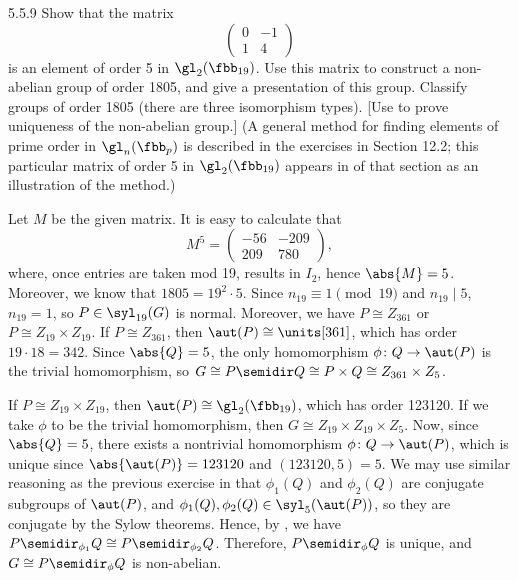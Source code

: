 \begin{exercise}{5.5.9}
    Show that the matrix
    \[
        \begin{pmatrix}
            0 & -1 \\
            1 & 4
        \end{pmatrix}
    \]
    is an element of order 5 in $\gl_2(\fbb_{19})$.
	Use this matrix to construct a non-abelian group of order 1805, and give a presentation of this group.
	Classify groups of order 1805 (there are three isomorphism types). [Use  to prove uniqueness of the non-abelian group.] (A general method for finding elements of prime order in $\gl_n(\fbb_p)$ is described in the exercises in Section 12.2; this particular matrix of order 5 in $\gl_2(\fbb_{19})$ appears in  of that section as an illustration of the method.)
\end{exercise}

\begin{sol}
    Let $M$ be the given matrix.
	It is easy to calculate that
    \[
    	M^5 = 
        \begin{pmatrix}
        -56 & -209 \\
        209 & 780
        \end{pmatrix},
	\]
    where, once entries are taken mod 19, results in $I_2$, hence $\abs{M} = 5$.
	Moreover, we know that $1805 = 19^2 \cdot 5$.
	Since $n_{19} \equiv 1 \pmod 19$ and $n_{19} \mid 5$, $n_{19} = 1$, so $P \in \syl_{19}(G)$ is normal.
	Moreover, we have $P \cong Z_{361}$ or $P \cong Z_{19} \times Z_{19}$.
	If $P \cong Z_{361}$, then $\aut(P) \cong \units[361]$, which has order $19 \cdot 18 = 342$.
	Since $\abs{Q} = 5$, the only homomorphism $\phi \colon Q \to \aut(P)$ is the trivial homomorphism, so $G \cong P \semidir Q \cong P \times Q \cong Z_{361} \times Z_5$.

    If $P \cong Z_{19} \times Z_{19}$, then $\aut(P) \cong \gl_2(\fbb_{19})$, which has order 123120.
	If we take $\phi$ to be the trivial homomorphism, then $G \cong Z_{19} \times Z_{19} \times Z_5$.
	Now, since $\abs{Q} = 5$, there exists a nontrivial homomorphism $\phi \colon Q \to \aut(P)$, which is unique since $\abs{\aut(P)} = 123120$ and $(123120, 5) = 5$.
	We may use similar reasoning as the previous exercise in that $\phi_1(Q)$ and $\phi_2(Q)$ are conjugate subgroups of $\aut(P)$, and $\phi_1(Q), \phi_2(Q) \in \syl_5(\aut(P))$, so they are conjugate by the Sylow theorems.
	Hence, by , we have $P \semidir_{\phi_1} Q \cong P \semidir_{\phi_2} Q$.
	Therefore, $P \semidir_\phi Q$ is unique, and $G \cong P \semidir_\phi Q$ is non-abelian.
\end{sol}

